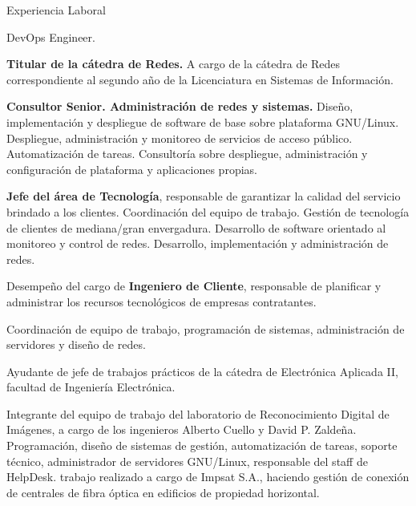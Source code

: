 \begin{rubric}{Experiencia Laboral}

 DevOps Engineer. 

 {\bfseries Titular de la cátedra de Redes.} A cargo de la cátedra
	de Redes correspondiente al segundo año de la Licenciatura en Sistemas de Información.

 {\bfseries Consultor Senior. Administración de redes y sistemas.}
	Diseño, implementación y despliegue de software de base sobre plataforma GNU/Linux. Despliegue, administración 
	y monitoreo de servicios de acceso público. Automatización de tareas. Consultoría sobre despliegue, administración 
	y configuración de plataforma y aplicaciones propias.

 {\bfseries Jefe del área de Tecnología}, responsable de garantizar 
	la calidad  del servicio brindado a los clientes. Coordinación del equipo de trabajo. Gestión 
	de tecnología de clientes de mediana/gran envergadura. Desarrollo de software orientado al 
	monitoreo y control de redes. Desarrollo, implementación y administración de redes.

 Desempeño del cargo de {\bfseries Ingeniero de Cliente}, 
	responsable de planificar y administrar los recursos tecnológicos de empresas 
	contratantes.

 Coordinación de equipo de trabajo, programación 
	de sistemas, administración de servidores y diseño de redes.
 
 Ayudante de jefe de trabajos prácticos de la
	cátedra de Electrónica Aplicada II, facultad de Ingeniería Electrónica.

  Integrante del equipo de trabajo
		del la\-bo\-ra\-to\-rio de Reconocimiento Digital de Imágenes, a cargo de 
		los ingenieros Alberto Cuello y David P. Zaldeña.
 Programación, diseño de sistemas de gestión,
	automatización de tareas, soporte técnico, administrador de servidores GNU/Linux, responsable
	del staff de HelpDesk.
 trabajo realizado a cargo de Impsat S.A., haciendo gestión
	de conexión de centrales de fibra óptica en edificios de propiedad horizontal.
 
\end{rubric}

